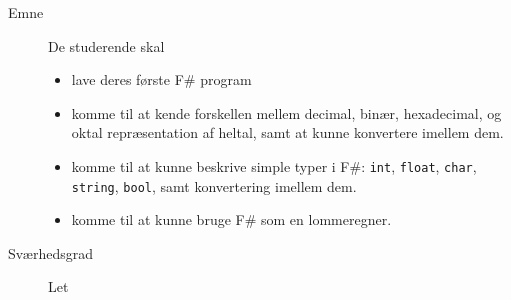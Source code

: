 \begin{description}
\item[Emne]
  De studerende skal
  \begin{itemize}
  \item lave deres første F\# program
  \item komme til at kende forskellen mellem decimal, binær,
    hexadecimal, og oktal repræsentation af heltal, samt at kunne
    konvertere imellem dem.
  \item komme til at kunne beskrive simple typer i F\#:
    \lstinline{int}, \lstinline{float}, \lstinline{char},
    \lstinline{string}, \lstinline{bool}, samt konvertering imellem
    dem.
  \item komme til at kunne bruge F\# som en lommeregner.
  \end{itemize}
\item[Sværhedsgrad] Let
\end{description}

